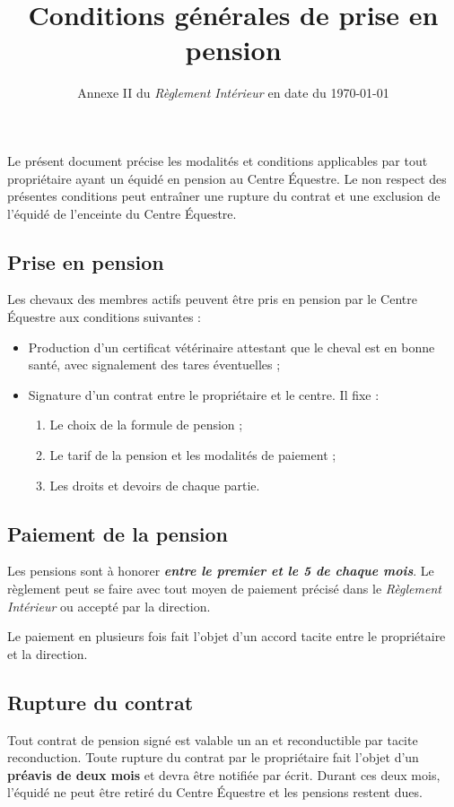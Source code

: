 \documentclass[11pt,a4paper]{article}
\title[Conditions générales de prise en pension\\ version du \today]{Conditions générales de prise en pension}
\subtitle{Annexe II du \textit{Règlement Intérieur} en date du \today}
\author{}
\date{}
\renewcommand{\emph}[1]{\textit{\textbf{#1}}}
\begin{document}
\maketitle


Le présent document précise les modalités et conditions applicables par tout propriétaire ayant un équidé en pension au Centre Équestre. Le non respect des présentes conditions peut entraîner une rupture du contrat et une exclusion de l'équidé de l'enceinte du Centre Équestre.

\subsection*{Prise en pension}
Les chevaux des membres actifs peuvent être pris en pension par le Centre Équestre aux conditions suivantes :
\begin{itemize}
\item
Production d'un certificat vétérinaire attestant que le cheval est en bonne santé, avec signalement des tares éventuelles ;
\item
Signature d'un contrat entre le propriétaire et le centre. Il fixe :
\begin{enumerate}
\item
Le choix de la formule de pension ;
\item
Le tarif de la pension et les modalités de paiement ;
\item
Les droits et devoirs de chaque partie.
\end{enumerate}
\end{itemize}

\subsection*{Paiement de la pension}
Les pensions sont à honorer \emph{entre le premier et le 5 de chaque mois}. Le règlement peut se faire avec tout moyen de paiement précisé dans le \textit{Règlement Intérieur} ou accepté par la direction.

Le paiement en plusieurs fois fait l'objet d'un accord tacite entre le propriétaire et la direction.

\subsection*{Rupture du contrat}
Tout contrat de pension signé est valable un an et reconductible par tacite reconduction. Toute rupture du contrat par le propriétaire fait l'objet d'un \textbf{préavis de deux mois} et devra être notifiée par écrit. Durant ces deux mois, l'équidé ne peut être retiré du Centre Équestre et les pensions restent dues.
\end{document}
